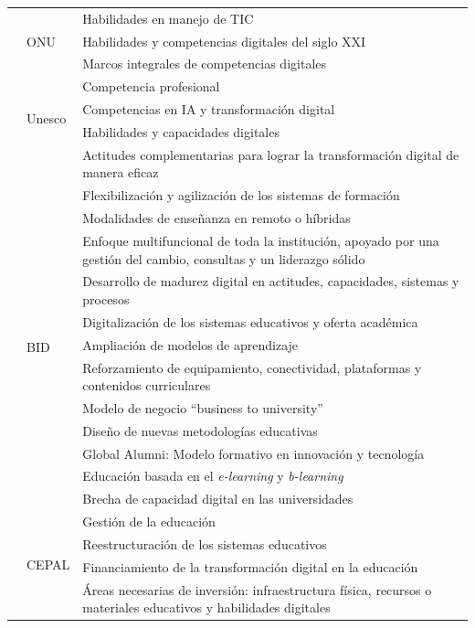 \begin{longtable}{
>{\raggedright\arraybackslash}p{} l >{\raggedright\arraybackslash}p{}}
    & & Habilidades en manejo de TIC \\
    & ONU & Habilidades y competencias digitales del siglo XXI \\
    & \multirow{5}{*}{Unesco} & Marcos integrales de competencias
    digitales \\
    & & Competencia profesional \\
    & & Competencias en IA y transformación digital \\
    & & Habilidades y capacidades digitales \\
    & & Actitudes complementarias para lograr la transformación digital de
    manera eficaz \\
\midrule
    \multirow{39}{=}{Aspecto organizacional} &
    \multirow{12}{*}{BID} & Flexibilización y agilización de los sistemas de
    formación \\
    & & Modalidades de enseñanza en remoto o híbridas \\
    & & Enfoque multifuncional de toda la institución, apoyado por una
    gestión del cambio, consultas y un liderazgo sólido \\
    & & Desarrollo de madurez digital en actitudes, capacidades, sistemas y
    procesos \\
    & & Digitalización de los sistemas educativos y oferta académica \\
    & & Ampliación de modelos de aprendizaje \\
    & & Reforzamiento de equipamiento, conectividad, plataformas y
    contenidos curriculares \\
    & & Modelo de negocio ``business to university'' \\
    & & Diseño de nuevas metodologías educativas \\
    & & Global Alumni: Modelo formativo en innovación y tecnología \\
    & & Educación basada en el \emph{e-learning} y \emph{b-learning} \\
    & & Brecha de capacidad digital en las universidades \\
    & \multirow{10}{*}{CEPAL} & Gestión de la educación \\
    & & Reestructuración de los sistemas educativos \\
    & & Financiamiento de la transformación digital en la educación \\
    & & Áreas necesarias de inversión: infraestructura física, recursos o
    materiales educativos y habilidades digitales \\

\end{longtable}
